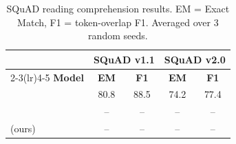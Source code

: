 
\begin{table}[t]
\centering
\small
\caption{
  SQuAD reading comprehension results.
  EM = Exact Match, F1 = token-overlap F1.
  Averaged over 3 random seeds.
}
\label{tab:squad}
\begin{tabular}{lcccc}
\toprule
 & \multicolumn{2}{c}{\textbf{SQuAD v1.1}} & \multicolumn{2}{c}{\textbf{SQuAD v2.0}} \\
\cmidrule(lr){2-3}\cmidrule(lr){4-5}
\textbf{Model} & \textbf{EM} & \textbf{F1} & \textbf{EM} & \textbf{F1} \\
\midrule
\bertbase{} & 80.8 & 88.5 & 74.2 & 77.4 \\
\baseline{} & -- & -- & -- & -- \\
\midrule
\model{} (ours) & -- & -- & -- & -- \\
\bottomrule
\end{tabular}
\end{table}
